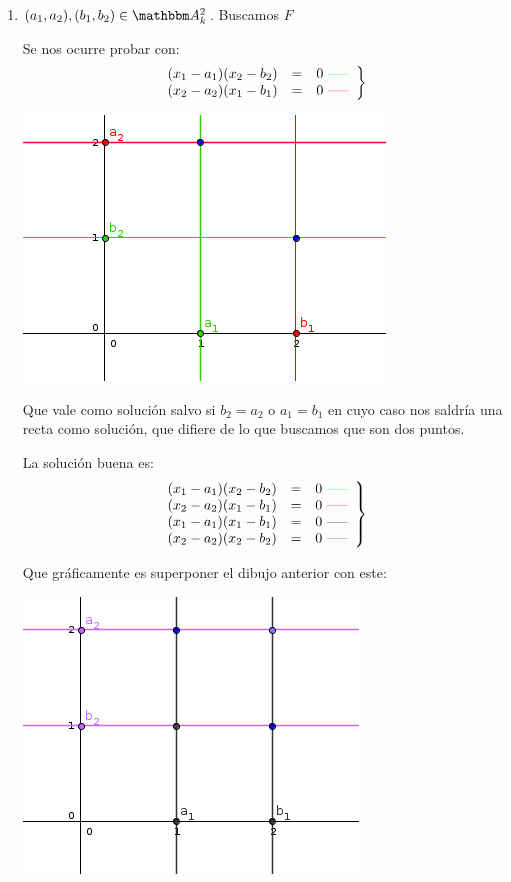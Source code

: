 \begin{example}
\begin{enumerate}
		
		\item $(a_1,a_2),(b_1,b_2) \in \A^2_k$. Buscamos $F$
		
		Se nos ocurre probar con:
		\[
		\left.
		\begin{array}{rcl}
		(x_1-a_1)(x_2-b_2) & = & 0  \text{ \textcolor{green}{-----}}\\
		(x_2-a_2)(x_1-b_1) & = & 0 \text{ \textcolor{red}{-----}}
		\end{array}
		\right\}
		\]
		
		\begin{center}
			\includegraphics[scale=0.45]{img/ej3.png}
		\end{center}
		
		Que vale como solución salvo si $b_2=a_2$ o $a_1=b_1$ en cuyo caso nos saldría una recta como solución, que difiere de lo que buscamos que son dos puntos.
		
		La solución buena es:
		\[
		\left.
		\begin{array}{rcl}
		(x_1-a_1)(x_2-b_2) & = & 0 \text{ \textcolor{green}{-----}}\\
		(x_2-a_2)(x_1-b_1) & = & 0 \text{ \textcolor{red}{-----}}\\
		(x_1-a_1)(x_1-b_1) & = & 0 \text{ \textcolor{black}{-----}}\\
		(x_2-a_2)(x_2-b_2) & = & 0 \text{ \textcolor{purple}{-----}}
		\end{array}
		\right\}
		\]
		
		Que gráficamente es superponer el dibujo anterior con este:
		
		\begin{center}
			\includegraphics[scale=0.45]{img/ej4.png}
		\end{center}
		

\end{enumerate}
\end{example}
